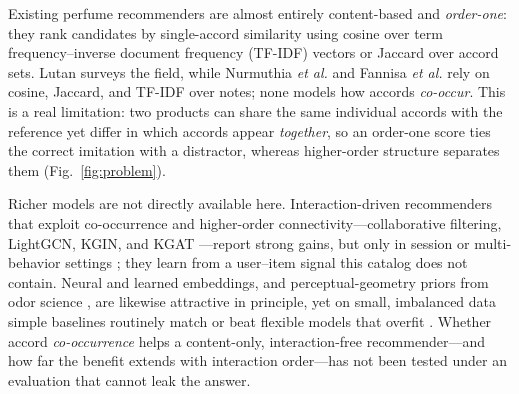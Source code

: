 \documentclass[conference]{IEEEtran}
\begin{document}
Existing perfume recommenders are almost entirely content-based and \emph{order-one}: they
rank candidates by single-accord similarity using cosine over term frequency--inverse
document frequency (TF-IDF) vectors or Jaccard over accord sets. Lutan \cite{r23} surveys the
field, while Nurmuthia \textit{et al.} \cite{r24} and Fannisa \textit{et al.} \cite{r28} rely
on cosine, Jaccard, and TF-IDF over notes; none models how accords \emph{co-occur}. This is a
real limitation: two products can share the same individual accords with the reference yet
differ in which accords appear \emph{together}, so an order-one score ties the correct
imitation with a distractor, whereas higher-order structure separates them
(Fig.~\ref{fig:problem}).

Richer models are not directly available here. Interaction-driven recommenders that exploit
co-occurrence and higher-order connectivity---collaborative filtering, LightGCN, KGIN, and
KGAT \cite{r18,r19,r20}---report strong gains, but only in session or multi-behavior settings
\cite{r1,r2,r3,r4,r5}; they learn from a user--item signal this catalog does not contain.
Neural and learned embeddings, and perceptual-geometry priors from odor science
\cite{r10,r11,r12,r13}, are likewise attractive in principle, yet on small, imbalanced data
simple baselines routinely match or beat flexible models that overfit \cite{r14,r15,r16,r17}.
Whether accord \emph{co-occurrence} helps a content-only, interaction-free recommender---and
how far the benefit extends with interaction order---has not been tested under an evaluation
that cannot leak the answer.
\end{document}
